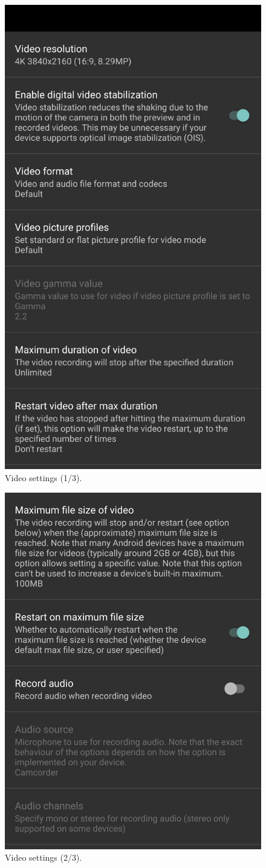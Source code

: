 \documentclass[12pt,letterpaper,english,bibliography=totocnumbered, abstract=on]{scrartcl}
\begin{document}
\begin{figure}[h]
\centering
\includegraphics[width=0.7\linewidth]{images/videosettings1}
\caption{Video settings (1/3).}
\label{fig:videosettings1}
\end{figure}

\begin{figure}[h]
	\centering
	\includegraphics[width=0.7\linewidth]{images/videosettings2}
	\caption{Video settings (2/3).}
	\label{fig:videosettings2}
\end{figure}
\end{document}
